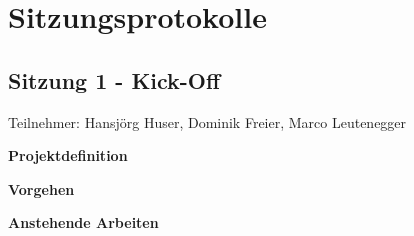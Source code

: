\chapter{Sitzungsprotokolle}
\label{chap:Sitzungsprotokolle}
\section{Sitzung 1 - Kick-Off}
Teilnehmer: Hansjörg Huser, Dominik Freier, Marco Leutenegger

\textbf{Projektdefinition}

\textbf{Vorgehen}

\textbf{Anstehende Arbeiten}